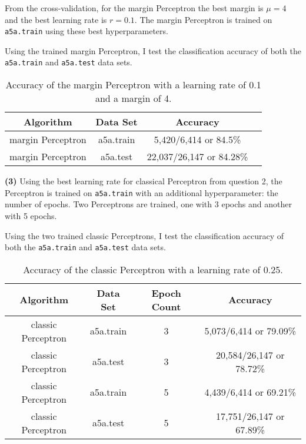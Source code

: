 \documentclass[11pt]{article}
\renewcommand\part[1]{\vspace{.10in}\textbf{(#1)}}
\begin{document}
From the cross-validation, for the margin Perceptron the best margin is $\mu = 4$ and the best learning rate is $r = 0.1$. The margin Perceptron is trained on \texttt{a5a.train} using these best hyperparameters. \newline

 \newline

Using the trained margin Perceptron, I test the classification accuracy of both the \texttt{a5a.train} and \texttt{a5a.test} data sets.

\begin{table}[H]
\centering
{\renewcommand{\arraystretch}{1.2}%
\begin{tabular}{| c | c | c | c |}
\hline
Algorithm& Data Set &Accuracy\\
\hline
margin Perceptron & a5a.train & 5,420/6,414 or 84.5\%\\ \hline
margin Perceptron & a5a.test & 22,037/26,147 or 84.28\%\\ \hline
\end{tabular}}
\caption{Accuracy of the margin Perceptron with a learning rate of 0.1 and a margin of 4.}
\end{table}

\part{3} Using the best learning rate for classical Perceptron from question 2, the Perceptron is trained on \texttt{a5a.train} with an additional hyperparameter: the number of epochs. Two Perceptrons are trained, one with 3 epochs and another with 5 epochs.\newline


 \newline

Using the two trained classic Perceptrons, I test the classification accuracy of both the \texttt{a5a.train} and \texttt{a5a.test} data sets.

\begin{table}[H]
\centering
{\renewcommand{\arraystretch}{1.2}%
\begin{tabular}{| c | c | c | c |}
\hline
Algorithm& Data Set & Epoch Count & Accuracy\\
\hline
classic Perceptron & a5a.train & 3 & 5,073/6,414 or 79.09\%\\ \hline
classic Perceptron & a5a.test & 3 & 20,584/26,147 or 78.72\%\\ \hline
classic Perceptron & a5a.train & 5 & 4,439/6,414 or 69.21\%\\ \hline
classic Perceptron & a5a.test & 5 & 17,751/26,147 or 67.89\%\\ \hline
\end{tabular}}
\caption{Accuracy of the classic Perceptron with a learning rate of 0.25.}
\end{table}
\end{document}
